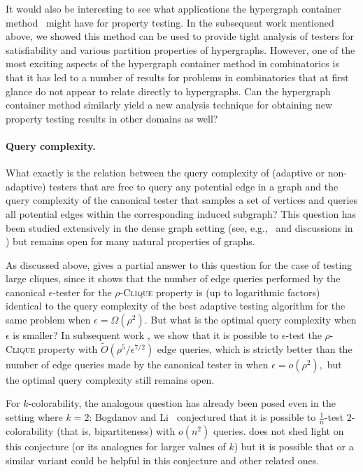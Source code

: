 \documentclass[11pt]{article}
\begin{document}
It would also be interesting to see what applications the hypergraph container method~\cite{baloghIndependentSetsHypergraphs2015,saxtonThomasonHypergraphContainers2015} might have for property testing.
In the subsequent work mentioned above, we showed this method can be used to provide tight analysis of testers for satisfiability and various partition properties of hypergraphs.
However, one of the most exciting aspects of the hypergraph container method in combinatorics is that it has led to a number of results for problems in combinatorics that at first glance do not appear to relate directly to hypergraphs.
Can the hypergraph container method similarly yield a new analysis technique for obtaining new property testing results in other domains as well?

\paragraph{Query complexity.}
What exactly is the relation between the query complexity of (adaptive or non-adaptive) testers that are free to query any potential edge in a graph and the query complexity of the canonical tester that samples a set of vertices and queries all potential edges within the corresponding induced subgraph? This question has been studied extensively in the dense graph setting (see, e.g.,~\cite{AlonFKS00,GoldreichTrevisan03,BogdanovTrevisan04,BogdanovLi2010,GonenRon10,GoldreichRon11,GoldreichWigderson21} and discussions in \cite{goldreich17,bhattacharyyaYoshida22}) but remains open for many natural properties of graphs. 

As discussed above,  gives a partial answer to this question for the case of testing large cliques, since it shows that the number of edge queries performed by the canonical $\epsilon$-tester for the \textsc{$\rho$-Clique} property is (up to logarithmic factors) identical to the query complexity of the best adaptive testing algorithm for the same problem when $\epsilon = \Omega(\rho^2)$. 
But what is the optimal query complexity when $\epsilon$ is smaller?
In subsequent work \cite{blais2024new}, we show that it is possible to $\epsilon$-test the \textsc{$\rho$-Clique} property with $\tilde{O}(\rho^5/\epsilon^{7/2})$ edge queries, which is strictly better than the number of edge queries made by the canonical tester in  when $\epsilon=o(\rho^2),$ but the optimal query complexity still remains open.

For $k$-colorability, the analogous question has already been posed even in the setting where $k=2$: Bogdanov and Li~\cite{BogdanovLi2010} conjectured that it is possible to $\frac1n$-test $2$-colorability (that is, bipartiteness) with $o(n^2)$ queries.   does not shed light on this conjecture (or its analogues for larger values of $k$) but it is possible that  or a similar variant could be helpful in this conjecture and other related ones.
\end{document}

